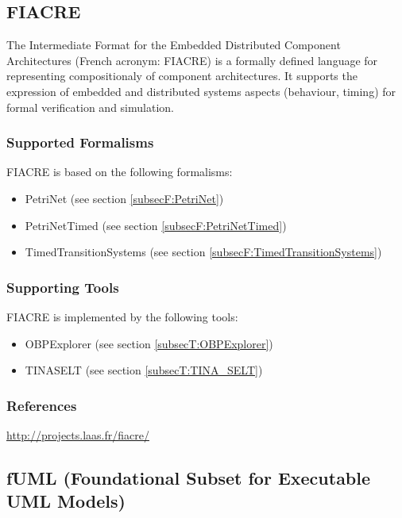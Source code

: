 \subsection{FIACRE}
\label{subsecL:FIACRE}


The Intermediate Format for the Embedded Distributed Component Architectures (French acronym: FIACRE) is a formally defined language for representing compositionaly of component architectures.
It supports the expression of embedded and distributed systems aspects (behaviour, timing) for formal verification and simulation.

\subsubsection{Supported Formalisms}

FIACRE is based on the following formalisms:
\begin{itemize}
	\item PetriNet (see section \ref{subsecF:PetriNet})
	\item PetriNetTimed (see section \ref{subsecF:PetriNetTimed})
	\item TimedTransitionSystems (see section \ref{subsecF:TimedTransitionSystems})
\end{itemize}


\subsubsection{Supporting Tools}

FIACRE is implemented by the following tools:
\begin{itemize}
	\item OBPExplorer (see section \ref{subsecT:OBPExplorer})
	\item TINA\textunderscore SELT (see section \ref{subsecT:TINA_SELT})
\end{itemize}


\subsubsection{References}


\url{http://projects.laas.fr/fiacre/}


\subsection{fUML (Foundational Subset for Executable UML Models)}
\label{subsecL:FUML}

